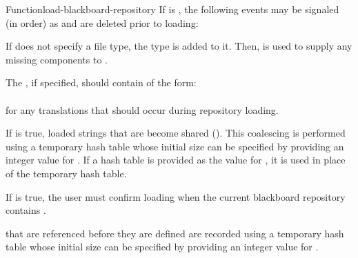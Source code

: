 \documentclass[10pt,twoside,english,pdftex]{article}
\begin{document}
\begin{functiondoc}{Function}{load-blackboard-repository}
\fnevents
{}%
%
%
%
%
%
%
%
%
%
%
%
If  is \nil, the following events may be signaled (in
order) as  and  are deleted prior
to loading:
\begin{tightitemize}
\item {}
\item {}
\item {}
\item {}
\end{tightitemize}

\fndescription If  does not specify a file type, the type
 is added to it.  Then,  is used
to supply any missing components to .

The  , if
specified, should contain  of the form:\\
%
~~~~~~~~\\
%
for any  translations that should occur during repository
loading.

If  is true, loaded strings that are
 become shared ().  This coalescing is performed
using a temporary hash table whose initial size can be specified by providing
an integer value for .  If a hash table is
provided as the value for , it is used in place
of the temporary hash table.

If  is true, the user must confirm loading
when the current blackboard repository contains .

 that are referenced before they are defined are
recorded using a temporary hash table whose initial size can be specified by
providing an integer value for .


\end{functiondoc}
\end{document}
